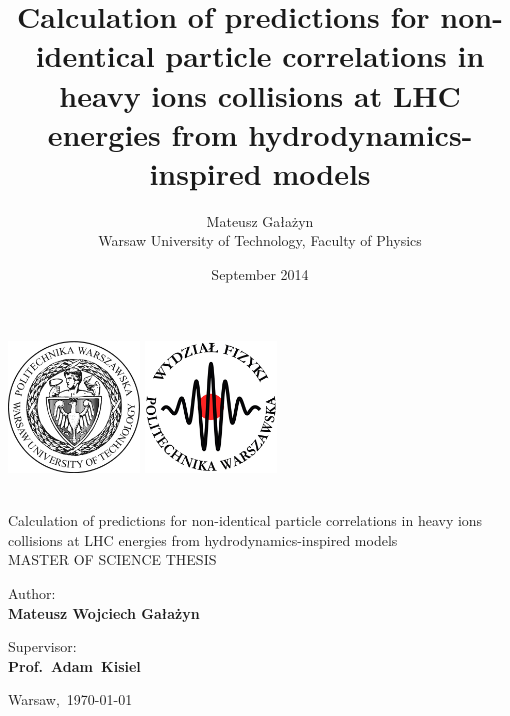 \documentclass[11pt,a4paper,openright]{report}
\title{Calculation of predictions for non-identical particle correlations in heavy ions collisions at LHC energies from hydrodynamics-inspired models}
\author{Mateusz Gałażyn \\  \centering Warsaw University of Technology, Faculty of Physics}
\date{September 2014}
\begin{document}


\newcommand{\HRule}{\rule{\linewidth}{0.1mm}} %

\begin{titlepage}
	\includegraphics[height=3.5cm]{wut}
	    \hfill
	\includegraphics[height=3.5cm]{wut_physics}

	\center
	{\textbf{}}\\[3.3cm]
	{ \Huge Calculation of predictions for non-identical particle correlations in heavy ions collisions at LHC energies from hydrodynamics-inspired models}
	\\[3cm]

	\LARGE\uppercase{Master of Science Thesis}\\[1.3cm]
		\begin{flushright} \Large
		Author:\hspace{2.cm}~\\
		\textbf{Mateusz Wojciech Gałażyn}\\[-0.5cm]
		\end{flushright}

		\begin{flushright} \Large
		Supervisor:\hspace{1.6cm}~\\
		\textbf{Prof.~Adam~{Kisiel}}\hspace{1.1cm}~\\[0.0cm]
		\end{flushright}

	{\large Warsaw,~\mydateEN\today}
	\vfill
\end{titlepage}	
\cleardoublepage
\end{document}
